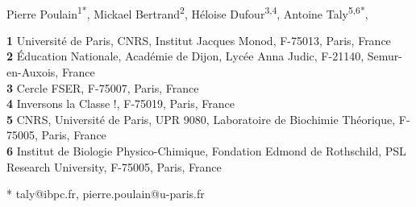 \documentclass[10pt,letterpaper]{article}
\begin{document}
\vspace*{0.2in}

\begin{flushleft}
{\Large
\textbf{} %
}
\newline
\\
Pierre Poulain\textsuperscript{1*},
Mickael Bertrand\textsuperscript{2},
Héloise Dufour\textsuperscript{3,4},
Antoine Taly\textsuperscript{5,6*},

\bigskip
\textbf{1} Université de Paris, CNRS, Institut Jacques Monod, F-75013, Paris, France
\\
\textbf{2} Éducation Nationale, Académie de Dijon, Lycée Anna Judic, F-21140, Semur-en-Auxois, France
\\
\textbf{3} Cercle FSER, F-75007, Paris, France
\\
\textbf{4} Inversons la Classe !, F-75019, Paris, France
\\
\textbf{5} CNRS, Université de Paris, UPR 9080, Laboratoire de Biochimie Théorique, F-75005, Paris, France
\\
\textbf{6} Institut de Biologie Physico-Chimique, Fondation Edmond de Rothschild, PSL Research University, F-75005, Paris, France
\\
\bigskip

% 
%





* taly@ibpc.fr, pierre.poulain@u-paris.fr

\end{flushleft}
\end{document}
